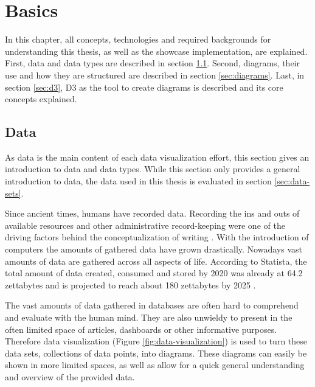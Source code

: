 \chapter{Basics}\label{sec:basics}

In this chapter, all concepts, technologies and required backgrounds for understanding this thesis, as well as the showcase implementation, are explained. First, data and data types are described in section \ref{sec:data}. Second, diagrams, their use and how they are structured are described in section \ref{sec:diagrams}. Last, in section \ref{sec:d3}, D3 as the tool to create diagrams is described and its core concepts explained.


\section{Data}\label{sec:data}
As data is the main content of each data visualization effort, this section gives an introduction to data and data types. While this section only provides a general introduction to data, the data used in this thesis is evaluated in section \ref{sec:data-sets}.

Since ancient times, humans have recorded data. Recording the ins and outs of available resources and other administrative record-keeping were one of the driving factors behind the conceptualization of writing \cite{senner1991origins}.
With the introduction of computers the amounts of gathered data have grown drastically. Nowadays vast amounts of data are gathered across all aspects of life. According to Statista, the total amount of data created, consumed and stored by 2020 was already at 64.2 zettabytes and is projected to reach about 180 zettabytes by 2025 \cite{statista_2022}.

The vast amounts of data gathered in databases are often hard to comprehend and evaluate with the human mind. They are also unwieldy to present in the often limited space of articles, dashboards or other informative purposes. Therefore data visualization (Figure \ref{fig:data-visualization}) is used to turn these data sets, collections of data points, into diagrams. These diagrams can easily be shown in more limited spaces, as well as allow for a quick general understanding and overview of the provided data.

